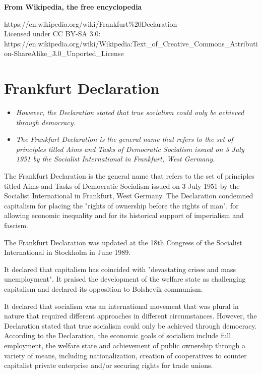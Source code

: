 \textbf{From Wikipedia, the free encyclopedia}

https://en.wikipedia.org/wiki/Frankfurt\%20Declaration\\
Licensed under CC BY-SA 3.0:\\
https://en.wikipedia.org/wiki/Wikipedia:Text\_of\_Creative\_Commons\_Attribution-ShareAlike\_3.0\_Unported\_License

\section{Frankfurt Declaration}\label{frankfurt-declaration}

\begin{itemize}
\item
  \emph{However, the Declaration stated that true socialism could only
  be achieved through democracy.}
\item
  \emph{The Frankfurt Declaration is the general name that refers to the
  set of principles titled Aims and Tasks of Democratic Socialism issued
  on 3 July 1951 by the Socialist International in Frankfurt, West
  Germany.}
\end{itemize}

The Frankfurt Declaration is the general name that refers to the set of
principles titled Aims and Tasks of Democratic Socialism issued on 3
July 1951 by the Socialist International in Frankfurt, West Germany. The
Declaration condemned capitalism for placing the "rights of ownership
before the rights of man", for allowing economic inequality and for its
historical support of imperialism and fascism.

The Frankfurt Declaration was updated at the 18th Congress of the
Socialist International in Stockholm in June 1989.

It declared that capitalism has coincided with "devastating crises and
mass unemployment". It praised the development of the welfare state as
challenging capitalism and declared its opposition to Bolshevik
communism.

It declared that socialism was an international movement that was plural
in nature that required different approaches in different circumstances.
However, the Declaration stated that true socialism could only be
achieved through democracy. According to the Declaration, the economic
goals of socialism include full employment, the welfare state and
achievement of public ownership through a variety of means, including
nationalization, creation of cooperatives to counter capitalist private
enterprise and/or securing rights for trade unions.

